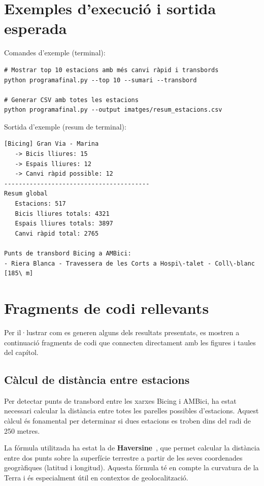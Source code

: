 \section{Exemples d'execució i sortida esperada}
Comandes d'exemple (terminal):

\begin{verbatim}
# Mostrar top 10 estacions amb més canvi ràpid i transbords
python programafinal.py --top 10 --sumari --transbord

# Generar CSV amb totes les estacions
python programafinal.py --output imatges/resum_estacions.csv
\end{verbatim}

Sortida d'exemple (resum de terminal):

\begin{verbatim}
[Bicing] Gran Via - Marina
   -> Bicis lliures: 15
   -> Espais lliures: 12
   -> Canvi ràpid possible: 12
----------------------------------------
Resum global
   Estacions: 517
   Bicis lliures totals: 4321
   Espais lliures totals: 3897
   Canvi ràpid total: 2765

Punts de transbord Bicing a AMBici:
- Riera Blanca - Travessera de les Corts a Hospi\-talet - Coll\-blanc [185\ m]
\end{verbatim}

\section{Fragments de codi rellevants}

Per il·lustrar com es generen alguns dels resultats presentats, es mostren a continuació
fragments de codi que connecten directament amb les figures i taules del capítol.

\subsection{Càlcul de distància entre estacions}

Per detectar punts de transbord entre les xarxes Bicing i AMBici, ha estat necessari calcular la distància entre totes les parelles possibles d’estacions. Aquest càlcul és fonamental per determinar si dues estacions es troben dins del radi de 250 metres.

La fórmula utilitzada ha estat la de \textbf{Haversine}~\cite{haversineFormula}, que permet calcular la distància entre dos punts sobre la superfície terrestre a partir de les seves coordenades geogràfiques (latitud i longitud). Aquesta fórmula té en compte la curvatura de la Terra i és especialment útil en contextos de geolocalització.

